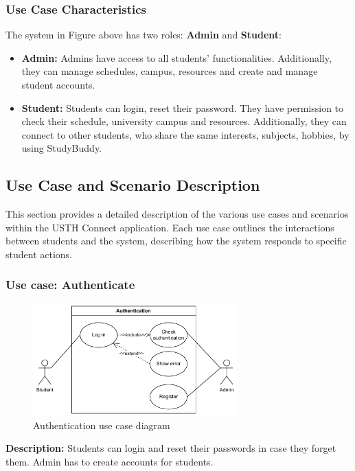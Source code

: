 \documentclass[12pt]{article}
\begin{document}
\subsubsection{Use Case Characteristics}
    The system in Figure above has two roles: \textbf{Admin} and \textbf{Student}:
    \begin{itemize}
        \item \textbf{Admin:} Admins have access to all students' functionalities. 
        Additionally, they can manage schedules, campus, resources and create and manage student accounts.
        \item \textbf{Student:}  Students can login, reset their password. They have permission to check their schedule, university campus and resources. Additionally, they can connect to other students, who share the same interests, subjects, hobbies,  by using StudyBuddy.
    \end{itemize}

\subsection{Use Case and Scenario Description}
    This section provides a detailed description of the various use cases and scenarios within the USTH Connect application. 
    Each use case outlines the interactions between students and the system, describing how the system responds to specific student actions.
\subsubsection{Use case: Authenticate}
    \begin{figure}[H]
        \centering
        \includegraphics[width=0.7\textwidth]{image/AuthenticationUseCase.pdf} 
        \caption{Authentication use case diagram}
        \label{fig:authenticate_use_case}
    \end{figure}
    \textbf{Description:} Students can login and reset their passwords in case they forget them. Admin has to create accounts for students. \\
\end{document}
